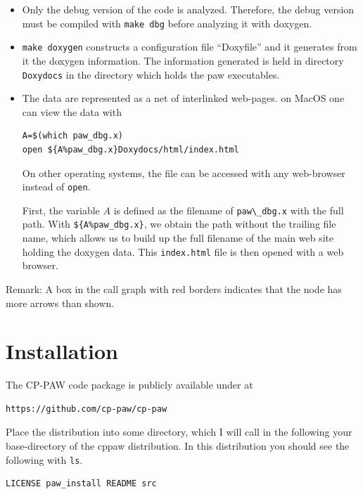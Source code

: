 \documentclass[final,12pt,makeidx,DIV=calc]{article}
\begin{document}
{{{\begin{itemize}
\item Only the debug version of the code is analyzed. Therefore, the
  debug version must be compiled with \verb|make dbg| before analyzing
  it with doxygen. 
%
\item \verb|make doxygen| constructs a configuration file ``Doxyfile''
  and it generates from it the doxygen information.  The information
  generated is held in directory \verb|Doxydocs| in the directory
  which holds the paw executables.
%
\item The data are represented as a net of interlinked web-pages.
on MacOS one can view the data with
\begin{verbatim}
A=$(which paw_dbg.x)
open ${A%paw_dbg.x}Doxydocs/html/index.html
\end{verbatim}
On other operating systems, the file can be accessed with any
web-browser instead of \verb|open|.

First, the variable $A$ is defined as the filename of
\verb|paw\_dbg.x| with the full path. With \verb|${A%paw_dbg.x}|, we
obtain the path without the trailing file name, which allows us to
build up the full filename of the main web site holding the doxygen
data. This \verb|index.html| file is then opened with a web browser.
%
\end{itemize}


Remark: A box in the call graph with red borders indicates that the
node has more arrows than shown.


\appendix
\section{Installation}
The CP-PAW code package is publicly available under at
\begin{verbatim}
https://github.com/cp-paw/cp-paw
\end{verbatim}

Place the distribution into some directory, which I will call in the
following your base-directory of the cppaw distribution. In this
distribution you should see the following with \verb|ls|.
\begin{verbatim}
LICENSE paw_install README src 
\end{verbatim}


}}}
\end{document}
